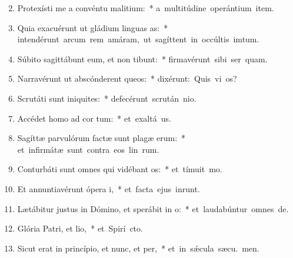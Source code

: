 \begin{flushleft}
\begin{enumerate}[leftmargin=*]
\setcounter{enumi}{1}


\item Protexísti me a convéntu malitium:~* \mbox{a multitúdine operántium item.}
\item Quia exacuérunt ut gládium linguas as:~* \mbox{intendérunt arcum rem amáram, ut sagíttent in occúltis imtum.}
\item Súbito sagittábunt eum, et non tibunt:~* \mbox{firmavérunt sibi ser quam.}
\item Narravérunt ut abscónderent queos:~* \mbox{dixérunt: Quis vi os?}
\item Scrutáti sunt iniquites:~* \mbox{defecérunt scrután nio.}
\item Accédet homo ad cor tum:~* \mbox{et exaltá us.}
\item Sagíttæ parvulórum factæ sunt plagæ erum:~* \mbox{et infirmátæ sunt contra eos lin rum.}
\item Conturbáti sunt omnes qui vidébant os:~* \mbox{et tímuit  mo.}
\item Et annuntiavérunt ópera i,~* \mbox{et facta ejus inrunt.}
\item Lætábitur justus in Dómino, et sperábit in o:~* \mbox{et laudabúntur omnes  de.}
\item Glória Patri, et lio,~* \mbox{et Spirí cto.}
\item Sicut erat in princípio, et nunc, et per,~* \mbox{et in s\'{\ae}cula sæcu. men.}

\end{enumerate}
\end{flushleft}

